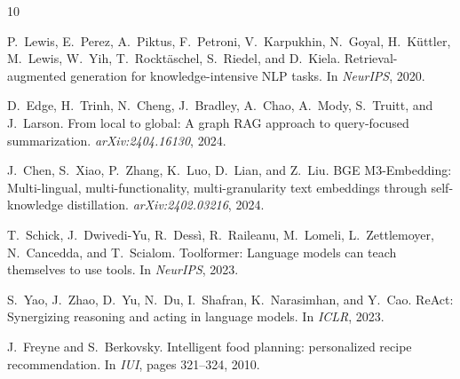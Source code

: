 \documentclass[11pt,twocolumn]{article}
\begin{document}

\begin{thebibliography}{10}

P.~Lewis, E.~Perez, A.~Piktus, F.~Petroni, V.~Karpukhin, N.~Goyal, H.~K{\"u}ttler, M.~Lewis, W.~Yih, T.~Rockt{\"a}schel, S.~Riedel, and D.~Kiela.
\newblock Retrieval-augmented generation for knowledge-intensive NLP tasks.
\newblock In \emph{NeurIPS}, 2020.

D.~Edge, H.~Trinh, N.~Cheng, J.~Bradley, A.~Chao, A.~Mody, S.~Truitt, and J.~Larson.
\newblock From local to global: A graph RAG approach to query-focused summarization.
\newblock \emph{arXiv:2404.16130}, 2024.

J.~Chen, S.~Xiao, P.~Zhang, K.~Luo, D.~Lian, and Z.~Liu.
\newblock BGE M3-Embedding: Multi-lingual, multi-functionality, multi-granularity text embeddings through self-knowledge distillation.
\newblock \emph{arXiv:2402.03216}, 2024.

T.~Schick, J.~Dwivedi-Yu, R.~Dess{\`i}, R.~Raileanu, M.~Lomeli, L.~Zettlemoyer, N.~Cancedda, and T.~Scialom.
\newblock Toolformer: Language models can teach themselves to use tools.
\newblock In \emph{NeurIPS}, 2023.

S.~Yao, J.~Zhao, D.~Yu, N.~Du, I.~Shafran, K.~Narasimhan, and Y.~Cao.
\newblock ReAct: Synergizing reasoning and acting in language models.
\newblock In \emph{ICLR}, 2023.

J.~Freyne and S.~Berkovsky.
\newblock Intelligent food planning: personalized recipe recommendation.
\newblock In \emph{IUI}, pages 321--324, 2010.

\end{thebibliography}
\end{document}
